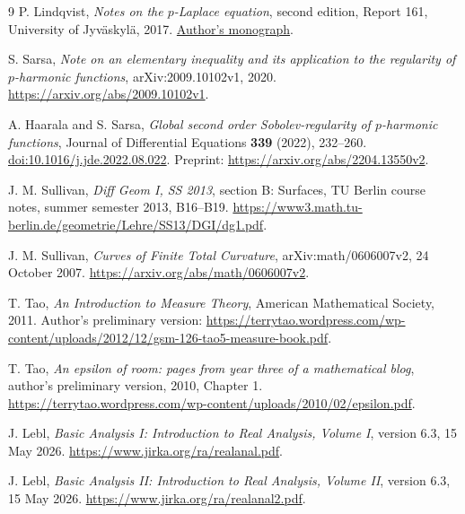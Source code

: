 \documentclass[11pt]{article}
\theoremstyle{remark}
\begin{document}
\begin{thebibliography}{9}
P. Lindqvist,
\emph{Notes on the $p$-Laplace equation}, second edition,
Report 161, University of Jyv\"askyl\"a, 2017.
\href{https://jyx.jyu.fi/bitstreams/2a8cbc94-58e9-4e75-94d6-0f1f5bc22ac1/download}
{Author's monograph}.

S. Sarsa,
\emph{Note on an elementary inequality and its application to the
regularity of $p$-harmonic functions},
arXiv:2009.10102v1, 2020.
\url{https://arxiv.org/abs/2009.10102v1}.

A. Haarala and S. Sarsa,
\emph{Global second order Sobolev-regularity of $p$-harmonic functions},
Journal of Differential Equations \textbf{339} (2022), 232--260.
\href{https://doi.org/10.1016/j.jde.2022.08.022}
{doi:10.1016/j.jde.2022.08.022}.
Preprint: \url{https://arxiv.org/abs/2204.13550v2}.

J. M. Sullivan,
\emph{Diff Geom I, SS 2013}, section B: Surfaces,
TU Berlin course notes, summer semester 2013, B16--B19.
\url{https://www3.math.tu-berlin.de/geometrie/Lehre/SS13/DGI/dg1.pdf}.

J. M. Sullivan,
\emph{Curves of Finite Total Curvature},
arXiv:math/0606007v2, 24 October 2007.
\url{https://arxiv.org/abs/math/0606007v2}.

T. Tao,
\emph{An Introduction to Measure Theory},
American Mathematical Society, 2011.
Author's preliminary version:
\url{https://terrytao.wordpress.com/wp-content/uploads/2012/12/gsm-126-tao5-measure-book.pdf}.

T. Tao,
\emph{An epsilon of room: pages from year three of a mathematical blog},
author's preliminary version, 2010, Chapter 1.
\url{https://terrytao.wordpress.com/wp-content/uploads/2010/02/epsilon.pdf}.

J. Lebl,
\emph{Basic Analysis I: Introduction to Real Analysis, Volume I},
version 6.3, 15 May 2026.
\url{https://www.jirka.org/ra/realanal.pdf}.

J. Lebl,
\emph{Basic Analysis II: Introduction to Real Analysis, Volume II},
version 6.3, 15 May 2026.
\url{https://www.jirka.org/ra/realanal2.pdf}.
\end{thebibliography}
\end{document}
